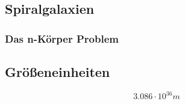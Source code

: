 \subsection{Spiralgalaxien}
\subsubsection{Das n-Körper Problem}

\subsection{Größeneinheiten}

\begin{equation}
  3.086 \cdot 10^{36} m
\end{equation}
